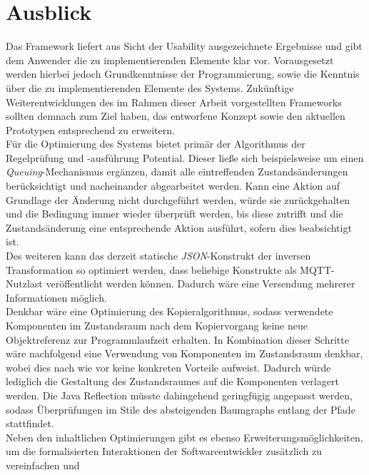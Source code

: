 \chapter{Ausblick}
\label{chap:ausblick}
    Das Framework liefert aus Sicht der Usability ausgezeichnete Ergebnisse und gibt dem Anwender die zu implementierenden Elemente klar vor. 
    Vorausgesetzt werden hierbei jedoch Grundkenntnisse der Programmierung, sowie die Kenntnis über die zu implementierenden Elemente des Systems. 
    Zukünftige Weiterentwicklungen des im Rahmen dieser Arbeit vorgestellten Frameworks sollten demnach zum Ziel haben, das entworfene Konzept 
    sowie den aktuellen Prototypen entsprechend zu erweitern. 
    \\
    \linebreak
    Für die Optimierung des Systems bietet primär der Algorithmus der Regelprüfung und -ausführung Potential. Dieser ließe sich beispielsweise 
    um einen \textit{Queuing}-Mechanismus ergänzen, damit alle eintreffenden Zustandsänderungen berücksichtigt und nacheinander abgearbeitet werden. 
    Kann eine Aktion auf Grundlage der Änderung nicht durchgeführt werden, würde sie zurückgehalten und die Bedingung immer wieder überprüft 
    werden, bis diese zutrifft und die Zustandsänderung eine entsprechende Aktion ausführt, sofern dies beabsichtigt ist. 
    \\
    \linebreak
    Des weiteren kann das derzeit statische \textit{JSON}-Konstrukt der inversen Transformation so optimiert werden, dass beliebige Konstrukte 
    als \acs{MQTT}-Nutzlast veröffentlicht werden können. Dadurch wäre eine Versendung mehrerer Informationen möglich. 
    \\
    Denkbar wäre eine Optimierung des Kopieralgorithmus, sodass verwendete Komponenten im Zustandsraum nach dem Kopiervorgang keine neue 
    Objektreferenz zur Programmlaufzeit erhalten. In Kombination dieser Schritte wäre nachfolgend eine Verwendung von Komponenten im Zustandsraum denkbar, wobei 
    dies nach wie vor keine konkreten Vorteile aufweist. Dadurch würde lediglich die Gestaltung des Zustandsraumes auf die Komponenten verlagert werden. 
    Die Java Reflection müsste dahingehend geringfügig angepasst werden, sodass Überprüfungen im Stile des absteigenden Baumgraphs entlang der Pfade stattfindet.
    \\
    \linebreak
    Neben den inhaltlichen Optimierungen gibt es ebenso Erweiterungsmöglichkeiten, um die formalisierten Interaktionen der Softwareentwickler zusätzlich zu vereinfachen und 
